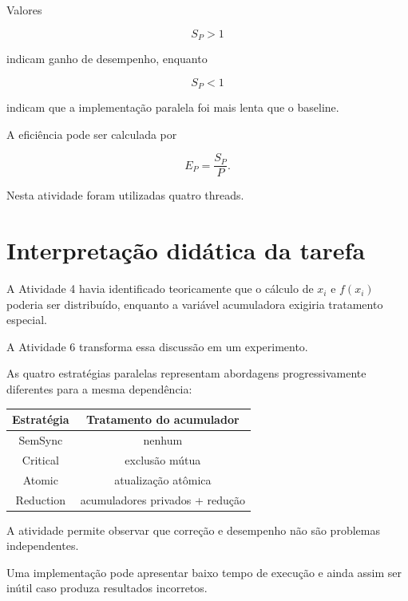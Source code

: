 Valores

\begin{equation}
    S_P>1
\end{equation}

indicam ganho de desempenho, enquanto

\begin{equation}
    S_P<1
\end{equation}

indicam que a implementação paralela foi mais lenta que o baseline.

A eficiência pode ser calculada por

\begin{equation}
    E_P =
    \frac{S_P}{P}.
    \label{eq:atvd06-eficiencia}
\end{equation}

Nesta atividade foram utilizadas quatro threads.


\section{Interpretação didática da tarefa}

\label{sec:atvd06-interpretacao}

A Atividade 4 havia identificado teoricamente que o cálculo de \(x_i\) e
\(f(x_i)\) poderia ser distribuído, enquanto a variável acumuladora exigiria
tratamento especial.

A Atividade 6 transforma essa discussão em um experimento.

As quatro estratégias paralelas representam abordagens progressivamente
diferentes para a mesma dependência:

\begin{center}
\begin{tabular}{c|c}
    \hline
    Estratégia & Tratamento do acumulador \\
    \hline
    SemSync & nenhum \\
    Critical & exclusão mútua \\
    Atomic & atualização atômica \\
    Reduction & acumuladores privados + redução \\
    \hline
\end{tabular}
\end{center}

A atividade permite observar que correção e desempenho não são problemas
independentes.

Uma implementação pode apresentar baixo tempo de execução e ainda assim ser
inútil caso produza resultados incorretos.

